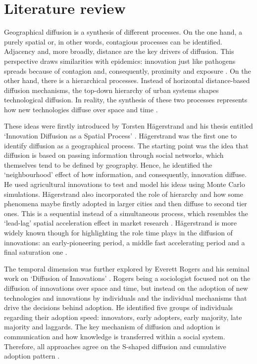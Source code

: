 \documentclass[
  authoryear,
  preprint,
  3p]{elsarticle}
\begin{document}
\section{Literature review}\label{sec-litreview}

Geographical diffusion is a synthesis of different processes. On the one
hand, a purely spatial or, in other words, contagious processes can be
identified. Adjacency and, more broadly, distance are the key drivers of
diffusion. This perspective draws similarities with epidemics:
innovation just like pathogens spreads because of contagion and,
consequently, proximity and exposure \citep{hivner2003facilitating}. On
the other hand, there is a hierarchical processes. Instead of horizontal
distance-based diffusion mechanisms, the top-down hierarchy of urban
systems shapes technological diffusion. In reality, the synthesis of
these two processes represents how new technologies diffuse over space
and time \citep{morrill2020spatial}.

These ideas were firstly introduced by Torsten Hägerstrand and his
thesis entitled `Innovation Diffusion as a Spatial Process'
\citep{hagerstrand1968innovation}. Hägerstrand was the first one to
identify diffusion as a geographical process. The starting point was the
idea that diffusion is based on passing information through social
networks, which themselves tend to be defined by geography. Hence, he
identified the `neighbourhood' effect of how information, and
consequently, innovation diffuse. He used agricultural innovations to
test and model his ideas using Monte Carlo simulations. Hägerstrand also
incorporated the role of hierarchy and how some phenomena maybe firstly
adopted in larger cities and then diffuse to second tier ones. This is a
sequential instead of a simultaneous process, which resembles the
`lead-lag' spatial acceleration effect in market research
\citep{bento2018time, PERES201091}. Hägerstrand is more widely known
though for highlighting the role time plays in the diffusion of
innovations: an early-pioneering period, a middle fast accelerating
period and a final saturation one \citep{morrill2020spatial}.

The temporal dimension was further explored by Everett Rogers and his
seminal work on `Diffusion of Innovations' \citep{rogers2010diffusion}.
Rogers being a sociologist focused not on the diffusion of innovations
over space and time, but instead on the adoption of new technologies and
innovations by individuals and the individual mechanisms that drive the
decisions behind adoption. He identified five groups of individuals
regarding their adoption speed: innovators, early adopters, early
majority, late majority and laggards. The key mechanism of diffusion and
adoption is communication and how knowledge is transferred within a
social system. Therefore, all approaches agree on the S-shaped diffusion
and cumulative adoption pattern \citep{grubler1990rise}.
\end{document}
